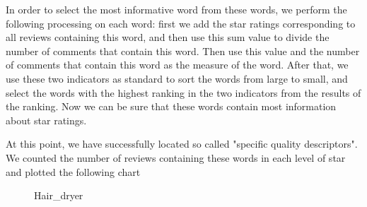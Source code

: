\documentclass[12pt]{mcmthesis}
\begin{document}
In order to select the most informative word from these words, we perform the following processing on each word: first we add the star ratings corresponding to all reviews containing this word, and then use this sum value to divide the number of comments that contain this word. Then use this value and the number of comments that contain this word as the measure of the word. After that, we use these two indicators as standard to sort the words from large to small, and select the words with the highest ranking in the two indicators from the results of the ranking. Now we can be sure that these words contain most information about star ratings.

At this point, we have successfully located so called "specific quality descriptors". We counted the number of reviews containing these words in each level of star and plotted the following chart

\begin{figure}[htbp]
	\centering
	\caption{Hair\_dryer}
\end{figure}
\end{document}
